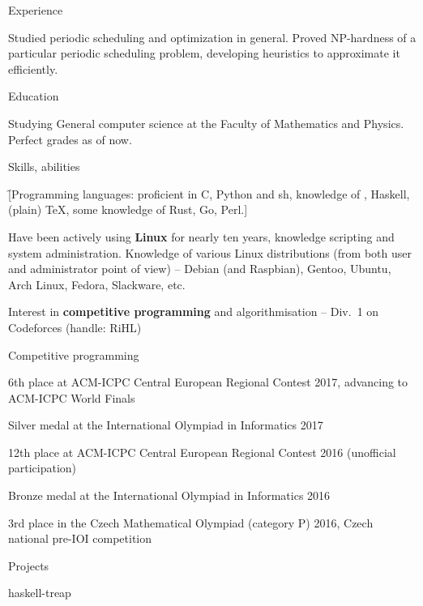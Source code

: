 

\newdimen\vyska
\vyska=1.5cm


\sekce Experience

 Studied periodic
scheduling and optimization in general. Proved NP-hardness of a particular
periodic scheduling problem, developing heuristics to approximate it
efficiently.

\sekce Education


Studying General computer science at the Faculty of Mathematics and Physics.
Perfect grades as of now.

\sekce Skills, abilities

\f[Programming languages: proficient in C, Python and sh, knowledge of \Cpp,
Haskell, (plain) \TeX, some knowledge of Rust, Go, Perl.]

Have been actively using {\bf Linux} for nearly ten years, knowledge scripting
and system administration. Knowledge of various Linux distributions (from both
user and administrator point of view) – Debian (and Raspbian), Gentoo, Ubuntu,
Arch Linux, Fedora, Slackware, etc.

Interest in {\bf competitive programming} and algorithmisation – Div.~1 on
Codeforces (handle: RiHL)

\sekce Competitive programming

6th place at ACM-ICPC Central European Regional Contest 2017, advancing to
ACM-ICPC World Finals

Silver medal at the International Olympiad in Informatics 2017

12th place at ACM-ICPC Central European Regional Contest 2016 (unofficial
participation)

Bronze medal at the International Olympiad in Informatics 2016

3rd place in the Czech Mathematical Olympiad (category P) 2016, Czech national
pre-IOI competition

\sekce Projects

haskell-treap


